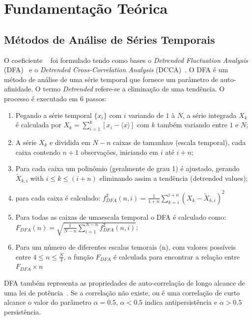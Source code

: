 \chapter{Fundamentação Teórica}
\label{cap:fund_teorica}

\section{Métodos de Análise de Séries Temporais}
\label{sec:dmc}

O coeficiente \pdcca~\cite{Zebende2011} foi formulado tendo como bases o \emph{Detrended Fluctuation Analysis} (DFA)~\cite{Peng_1994} e o \emph{Detrended Cross-Correlation Analysis} (DCCA)~\cite{Podobnik2008}. O DFA é um método de análise de uma série temporal que fornece um parâmetro de auto-afinidade. O termo \emph{Detrended} refere-se a eliminação de uma tendência. O processo é executado em 6 passos:

\begin{enumerate}
    \label{dfa}
    \item Pegando a série temporal \(\{x_{i}\}\) com  \(i\) variando de  \(1\) à \(N\), a série integrada \(X_{k}\) é calculada por \(X_{k} = \sum_{i=1}^{k}\left[x_{i} - \langle x \rangle \right] \) com \(k\) também variando entre \(1\) e \(N\);
    \item A série  \(X_{k}\) e dividida em \(N - n\) caixas de tamanha\(n\) (escala temporal), cada caixa contendo \(n + 1\) observações, iniciando em \(i\) até \(i + n\);
    \item Para cada caixa um polinômio (geralmente de grau 1) é ajustado, gerando \(\widetilde{X}_{k, i}\) with \( i \le k \le (i + n) \) eliminando assim a tendência (detrended values);
    \item  para cada caixa é calculado: \(f_{DFA}^{2}(n, i) = \frac{1}{1+n} \sum_{k=i}^{i + n}(X_{k}-\widetilde{X}_{k, i})^{2}\)
    \item Para todas as caixas de umaescala temporal o DFA é calculado como: \(F_{DFA}(n) = \sqrt{\frac{1}{N - n} \sum_{i=1}^{N-n} f_{DFA}^{2}(n, i)}\);
    \item Para um número de diferentes escalas temorais (n), com valores possíveis entre \( 4 \le n \le \frac{N}{4}\), a função \(F_{DFA}\) é calculada para encontrar a relação entre \(F_{DFA} \times n\)
  \end{enumerate}

DFA também  representa as propriedades de auto-correlação de longo alcance de uma lei de potência~\cite{Zebende2013}. Se a correlação não existe, ou é uma correlação de curto alcance o valor do parâmetro \(\alpha = 0.5\), \(\alpha < 0.5\) indica antipersistência e \(\alpha > 0.5\) persistência.

